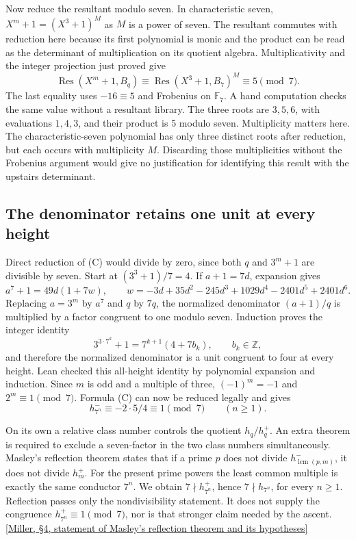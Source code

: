 \documentclass[12pt,letterpaper]{article}
\begin{document}
Now reduce the resultant modulo seven. In characteristic seven,
\(X^m+1=(X^3+1)^M\) as \(M\) is a power of seven. The resultant commutes with reduction here because its first polynomial is monic and the product can be read as the determinant of multiplication on its quotient algebra. Multiplicativity and the integer projection just proved give
\[
 \operatorname{Res}(X^m+1,B_q)
 \equiv\operatorname{Res}(X^3+1,B_7)^M
 \equiv5\pmod7 .
\]
The last equality uses \(-16\equiv5\) and Frobenius on \(\mathbb F_7\). A hand computation checks the same value without a resultant library. The three roots are \(3,5,6\), with evaluations \(1,4,3\), and their product is 5 modulo seven. Multiplicity matters here. The characteristic-seven polynomial has only three distinct roots after reduction, but each occurs with multiplicity \(M\). Discarding those multiplicities without the Frobenius argument would give no justification for identifying this result with the upstairs determinant.

\subsection{The denominator retains one unit at every height}

Direct reduction of (C) would divide by zero, since both \(q\) and \(3^m+1\) are divisible by seven. Start at \((3^3+1)/7=4\). If \(a+1=7d\), expansion gives
\[
 a^7+1=49d(1+7w),\qquad
 w=-3d+35d^2-245d^3+1029d^4-2401d^5+2401d^6.
\]
Replacing \(a=3^m\) by \(a^7\) and \(q\) by \(7q\), the normalized denominator \((a+1)/q\) is multiplied by a factor congruent to one modulo seven. Induction proves the integer identity
\[
 3^{3\cdot7^k}+1=7^{k+1}(4+7b_k),\qquad b_k\in\mathbb Z ,
\]
and therefore the normalized denominator is a unit congruent to four at every height. Lean checked this all-height identity by polynomial expansion and induction. Since \(m\) is odd and a multiple of three, \((-1)^m=-1\) and \(2^m\equiv1\pmod7\). Formula (C) can now be reduced legally and gives
\[
             h^-_{7^n}\equiv -2\cdot5/4\equiv1\pmod7
             \qquad(n\ge1).
\]

On its own a relative class number controls the quotient \(h_q/h^+_q\). An extra theorem is required to exclude a seven-factor in the two class numbers simultaneously. Masley's reflection theorem states that if a prime \(p\) does not divide \(h^-_{\operatorname{lcm}(p,m)}\), it does not divide \(h^+_m\). For the present prime powers the least common multiple is exactly the same conductor \(7^n\). We obtain \(7\nmid h_{7^n}^+\), hence \(7\nmid h_{7^n}\), for every \(n\ge1\). Reflection passes only the nondivisibility statement. It does not supply the congruence \(h_{7^n}^+\equiv1\pmod7\), nor is that stronger claim needed by the ascent. \href{https://doi.org/10.1112/S1461157014000382}{[Miller, \S4, statement of Masley's reflection theorem and its hypotheses]}
\end{document}
